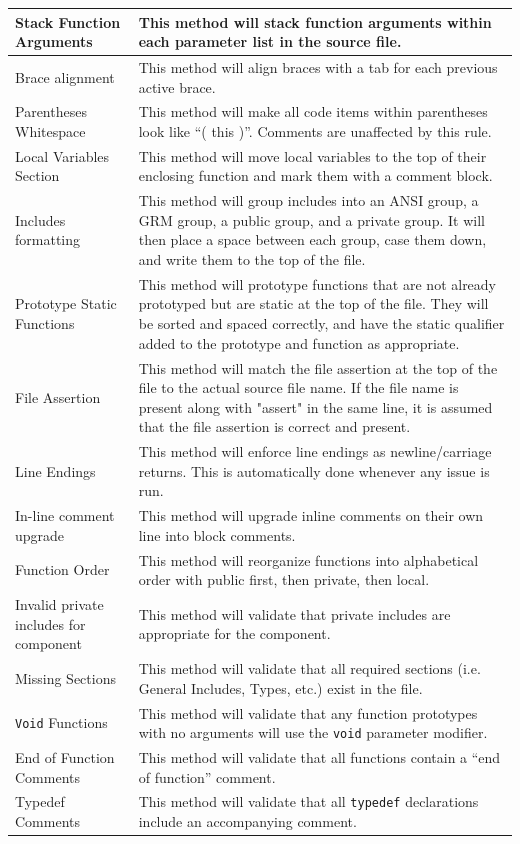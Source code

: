 \documentclass[11pt]{scrreprt}
\begin{document}
\begin{longtable}{| p{} | p{} |}
Stack Function Arguments & This method will stack function arguments within each parameter list in the source file.\\ \hline
Brace alignment & This method will align braces with a tab for each previous active brace.\\ \hline
Parentheses Whitespace & This method will make all code items within parentheses look like ``( this )''. Comments are unaffected by this rule.\\ \hline
Local Variables Section & This method will move local variables to the top of their enclosing function and mark them with a comment block.\\ \hline
Includes formatting & This method will group includes into an ANSI group, a GRM group, a public group, and a private group. It will then place a space between each group, case them down, and write them to the top of the file.\\ \hline
Prototype Static Functions & This method will prototype functions that are not already prototyped but are static at the top of the file. They will be sorted and spaced correctly, and have the static qualifier added to the prototype and function as appropriate.\\ \hline
File Assertion & This method will match the file assertion at the top of the file to the actual source file name. If the file name is present along with "assert" in the same line, it is assumed that the file assertion is correct and present.\\ \hline
Line Endings & This method will enforce line endings as newline/carriage returns. This is automatically done whenever any issue is run.\\ \hline
In-line comment upgrade & This method will upgrade inline comments on their own line into block comments.\\ \hline
Function Order & This method will reorganize functions into alphabetical order with public first, then private, then local.\\ \hline
Invalid private includes for component & This method will validate that private includes are appropriate for the component.\\ \hline
Missing Sections & This method will validate that all required sections (i.e. General Includes, Types, etc.) exist in the file.\\ \hline
\texttt{Void} Functions & This method will validate that any function prototypes with no arguments will use the \texttt{void} parameter modifier.\\ \hline
End of Function Comments & This method will validate that all functions contain a ``end of function'' comment.\\ \hline
Typedef Comments & This method will validate that all \texttt{typedef} declarations include an accompanying comment.\\ \hline

\end{longtable}
\end{document}
